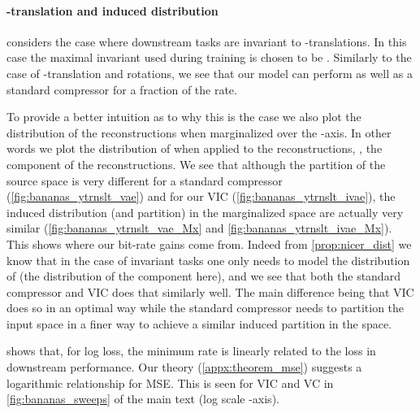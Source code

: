 \documentclass[final]{article}
\begin{document}
\paragraph{-translation and induced distribution}
 considers the case where downstream tasks are invariant to -translations.
In this case the maximal invariant used during training is chosen to be .
Similarly to the case of -translation and rotations, we see that our model can perform as well as a standard compressor for a fraction of the rate.

To provide a better intuition as to why this is the case we also plot the distribution of the reconstructions when marginalized over the -axis.
In other words we plot the distribution of  when applied to the reconstructions, \ie, the  component of the reconstructions.
We see that although the partition of the source space is very different for a standard compressor (\cref{fig:bananas_ytrnslt_vae}) and for our VIC (\cref{fig:bananas_ytrnslt_ivae}), the induced distribution (and partition) in the marginalized space are actually very similar (\cref{fig:bananas_ytrnslt_vae_Mx} and \cref{fig:bananas_ytrnslt_ivae_Mx}).
This shows where our bit-rate gains come from. 
Indeed from \cref{prop:nicer_dist} we know that in the case of invariant tasks one only needs to model the distribution of  (\eg the distribution of the  component here), and we see that both the standard compressor and VIC does that similarly well.
The main difference being that VIC does so in an optimal way while the standard compressor needs to partition the input space in a finer way to achieve a similar induced partition in the  space.




















 shows that, for log loss, the minimum rate is linearly related to the loss  in downstream performance.
Our theory (\cref{appx:theorem_mse}) suggests a logarithmic relationship for MSE.
This is seen for VIC and VC in \cref{fig:bananas_sweeps} of the main text (log scale -axis).
\end{document}

